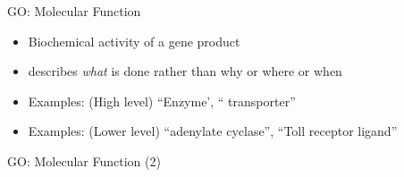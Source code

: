 \documentclass{beamer}
\begin{document}

\begin{frame}{GO: Molecular Function}
\begin{itemize}
\item Biochemical activity of a gene product
\item describes \textit{what} is done rather than why or where or when
\item Examples: (High level) \textquotedblleft Enzyme',  \textquotedblleft 
transporter\textquotedblright
\item Examples: (Lower level) \textquotedblleft adenylate cyclase\textquotedblright, 
\textquotedblleft Toll receptor ligand\textquotedblright
\end{itemize}
\end{frame}
\begin{frame}{GO: Molecular Function (2)}
\begin{center}
\end{center}
\end{frame}
\end{document}
